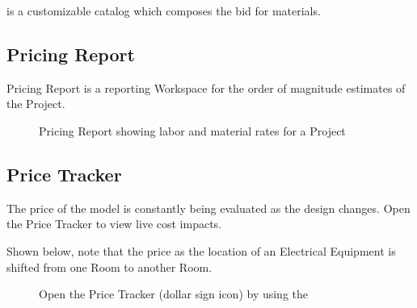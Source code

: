 \documentclass[letterpaper,10pt,english]{sphinxmanual}
\begin{document}
{\hyperref[\detokenize{docs/userguide/pricingmodel/equipmentrates/index-equipment_rates:equipment-rates}]{}} is a customizable catalog which composes the bid for materials.


\subsection{Pricing Report}
\label{\detokenize{docs/userguide/pricingmodel/pricingreport/index-pricing_report:pricing-report}}\label{\detokenize{docs/userguide/pricingmodel/pricingreport/index-pricing_report:id1}}\label{\detokenize{docs/userguide/pricingmodel/pricingreport/index-pricing_report::doc}}
Pricing Report is a reporting Workspace for the order of magnitude estimates of the Project.

\begin{figure}[H]
\centering
\capstart

\noindent{}
\caption{Pricing Report showing labor and material rates for a Project}\label{\detokenize{docs/userguide/pricingmodel/pricingreport/index-pricing_report:id2}}\end{figure}


\subsection{Price Tracker}
\label{\detokenize{docs/userguide/pricingmodel/pricetracker/index-price_tracker:price-tracker}}\label{\detokenize{docs/userguide/pricingmodel/pricetracker/index-price_tracker:id1}}\label{\detokenize{docs/userguide/pricingmodel/pricetracker/index-price_tracker::doc}}
The price of the model is constantly being evaluated as the design changes.  Open the Price Tracker to view live cost impacts.

Shown below, note that the price as the location of an Electrical Equipment is shifted from one Room to another Room.

\begin{figure}[H]
\centering
\capstart

\noindent{}
\caption{Open the Price Tracker (dollar sign icon) by using the {\hyperref[\detokenize{docs/userguide/index-user_guide:id10}]{}}}\label{\detokenize{docs/userguide/pricingmodel/pricetracker/index-price_tracker:id2}}\end{figure}
\end{document}
